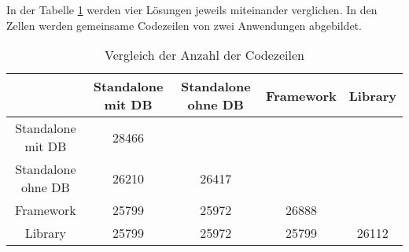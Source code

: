 In der Tabelle \ref{tab:compareLoC} werden vier Lösungen jeweils miteinander verglichen.
In den Zellen werden gemeinsame Codezeilen von zwei Anwendungen abgebildet.

\begin{table}[h!]
    \centering
    \begin{tabular}{|c|c| c| c| c| }
    \hline
                        & Standalone mit DB & Standalone ohne DB    & Framework & Library \\ 
    \hline
    Standalone mit DB   & 28466             &                       &           & \\  
    \hline
    Standalone ohne DB  & 26210             & 26417                 &           & \\  
    \hline
    Framework           & 25799             & 25972                 & 26888     & \\  
    \hline
    Library             & 25799             & 25972                 & 25799     & 26112 \\
    \hline
    \end{tabular}
    \caption{Vergleich der Anzahl der Codezeilen}
    \label{tab:compareLoC}
\end{table}